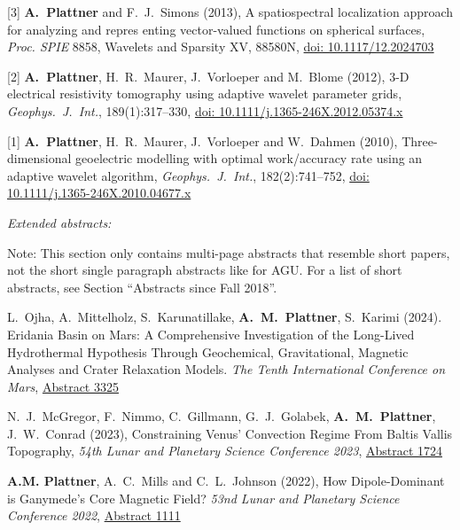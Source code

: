 \documentclass[10pt]{article}
\begin{document}
\spcp
\hspace{-0.5cm}[3] \textbf{A.~Plattner} and F.~J.~Simons (2013), 
A spatiospectral localization approach for analyzing and repres enting vector-valued functions on spherical surfaces,
\emph{Proc. SPIE} 8858, Wavelets and Sparsity XV, 88580N,
\href{http://proceedings.spiedigitallibrary.org/proceeding.aspx?articleid=1745029}{doi: 10.1117/12.2024703}

\spcp
\hspace{-0.5cm}[2] \textbf{A.~Plattner}, H.~R.~Maurer, J.~Vorloeper and M.~Blome (2012),
3-D electrical resistivity tomography using adaptive wavelet parameter grids,
\emph{Geophys.~J.~Int.}, 189(1):317--330,
\href{https://academic.oup.com/gji/article-lookup/doi/10.1111/j.1365-246X.2012.05374.x}{doi: 10.1111/j.1365-246X.2012.05374.x}

\spcp
\hspace{-0.5cm}[1] \textbf{A.~Plattner}, H.~R.~Maurer, J.~Vorloeper and W.~Dahmen (2010),
Three-dimensional geoelectric modelling with optimal work/accuracy rate 
using an adaptive wavelet algorithm,
\emph{Geophys.~J.~Int.}, 182(2):741--752,
\href{https://academic.oup.com/gji/article-lookup/doi/10.1111/j.1365-246X.2010.04677.x}{doi: 10.1111/j.1365-246X.2010.04677.x}

\spc
\emph{Extended abstracts:}


\vspace{0.2cm}
Note: This section only contains multi-page abstracts that resemble short papers, not the short single paragraph abstracts like for AGU. For a list of short abstracts, see Section ``Abstracts since Fall 2018''.

\spcp
\shift [12] L.\ Ojha, A.\ Mittelholz, S.\ Karunatillake, \textbf{A.\ M.\ Plattner}, S.\ Karimi (2024). Eridania Basin on Mars: A Comprehensive Investigation of the Long-Lived Hydrothermal Hypothesis Through Geochemical, Gravitational, Magnetic Analyses and Crater Relaxation Models. \emph{The Tenth International Conference on Mars}, \href{https://www.hou.usra.edu/meetings/tenthmars2024/pdf/3325.pdf}{Abstract 3325}

\spcp
\shift [11] N.~J.~McGregor, F.~Nimmo, C.~Gillmann, G.~J.~Golabek, \textbf{A.~M.~Plattner}, J.~W.~Conrad (2023), Constraining Venus' Convection Regime From Baltis Vallis Topography, \emph{54th Lunar and Planetary Science Conference 2023},
\href{https://www.hou.usra.edu/meetings/lpsc2023/pdf/1724.pdf}{Abstract 1724}


\spcp
\shift [10] \textbf{A.M. Plattner}, A.~C.~Mills and C.~L.~Johnson (2022), How Dipole-Dominant is Ganymede's Core Magnetic Field?
\emph{53nd Lunar and Planetary Science Conference 2022},
\href{https://www.hou.usra.edu/meetings/lpsc2022/pdf/1111.pdf}{Abstract 1111}
\end{document}
